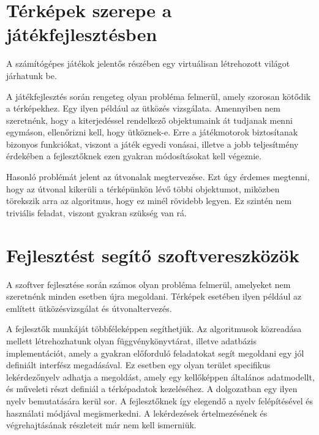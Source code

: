 \begin{comment}{Megnézni pár példát, hogy milyen implementációk, típusok és műveletek vannak!}
\end{comment}


\section{Térképek szerepe a játékfejlesztésben}

A számítógépes játékok jelentős részében egy virtuálisan létrehozott világot járhatunk be.

A játékfejlesztés során rengeteg olyan probléma felmerül, amely szorosan kötődik a térképekhez. Egy ilyen például az ütközés vizsgálata. Amennyiben nem szeretnénk, hogy a kiterjedéssel rendelkező objektumaink át tudjanak menni egymáson, ellenőrizni kell, hogy ütköznek-e. Erre a játékmotorok biztosítanak bizonyos funkciókat, viszont a játék egyedi vonásai, illetve a jobb teljesítmény érdekében a fejlesztőknek ezen gyakran módosításokat kell végeznie.

Hasonló problémát jelent az útvonalak megtervezése. Ezt úgy érdemes megtenni, hogy az útvonal kikerüli a térképünkön lévő többi objektumot, miközben törekszik arra az algoritmus, hogy ez minél rövidebb legyen. Ez szintén nem triviális feladat, viszont gyakran szükség van rá.

\section{Fejlesztést segítő szoftvereszközök}

A szoftver fejlesztése során számos olyan probléma felmerül, amelyeket nem szeretnénk minden esetben újra megoldani. Térképek esetében ilyen például az említett ütközésvizsgálat és útvonaltervezés.

A fejlesztők munkáját többféleképpen segíthetjük. Az algoritmusok közreadása mellett létrehozhatunk olyan függvénykönyvtárat, illetve adatbázis implementációt, amely a gyakran előforduló feladatokat segít megoldani egy jól definiált interfész megadásával. Ez esetben egy olyan terület specifikus lekérdezőnyelv adhatja a megoldást, amely egy kellőképpen általános adatmodellt, és műveleti részt definiál a térképadatok kezeléséhez. A dolgozatban egy ilyen nyelv bemutatására kerül sor. A fejlesztőknek így elegendő a nyelv felépítésével és használati módjával megismerkedni. A lekérdezések értelmezésének és végrehajtásának részleteit már nem kell ismerniük.
